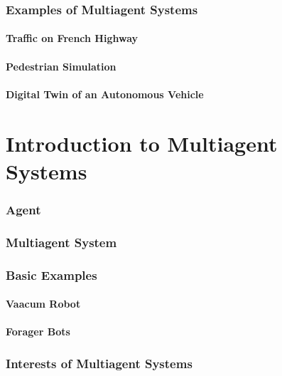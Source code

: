 \begin{bibliographysection}
	\section[MABS Examples]{Examples of Multiagent Systems}
	\subsection{Traffic on French Highway}
	
	\subsection{Pedestrian Simulation}
	
	\subsection{Digital Twin of an Autonomous Vehicle}
	

	\thanksslide
\end{bibliographysection}

\part{Introduction to Multiagent Systems}
\begin{bibliographysection}

	\section{Agent}
	

	\section{Multiagent System}
	

	\section{Basic Examples}
	\subsection{Vaacum Robot}
	
	\subsection{Forager Bots}
	

	\section{Interests of Multiagent Systems}
	

	\thanksslide
\end{bibliographysection}

